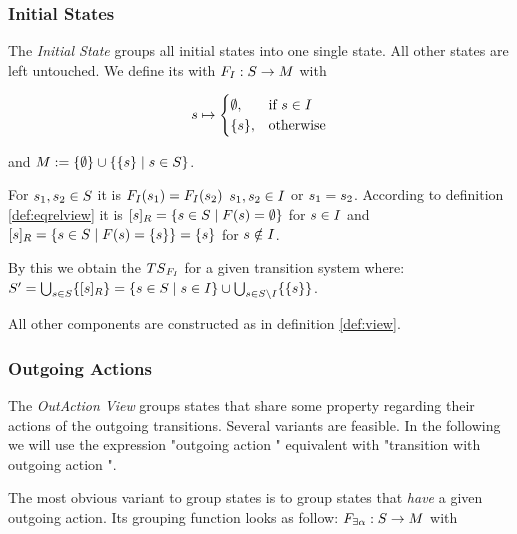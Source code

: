 \documentclass[preview]{standalone}
\begin{document}


\subsubsection{Initial States}
The \emph{Initial State \viewNC}  groups all initial states into one single state. All other states are left untouched.
We define its \grpfctN with ${F}_{I} : {S} \to {\ensuremath{{M}}}$ with 

\[
{s} \mapsto
\begin{cases}
	\emptyset,				& \text{if } {s} \in {I} \\
	\{{s}\},          	& \text{otherwise}
\end{cases}
\]

and ${{M}} := \{\emptyset\} \cup \{\{{s}\} \mid {s} \in {S}\}$.

For ${s}_1,{s}_2 \in {S}$ it is ${{{{F}}_{I}}}({s}_1) = {{{{F}}_{I}}}({s}_2)$ \iffN ${s}_1, {s}_2 \in {I}$ or ${s}_1 = {s}_2$. According to definition \ref{def:eqrelview} it is ${{[{s}]_{{R}}}} = \{{s} \in {S} \mid {F}({s}) = \emptyset\}$ for ${s} \in {I}$ and ${{[{s}]_{{R}}}} = \{{s} \in {S} \mid {F}({s}) = \{{s}\} \} = \{{s}\}$ for ${s} \notin {I}$.

By this we obtain the \viewN ${{{{TS}}_{{{{F}}_{I}}}}}$ for a given transition system \ts where: ${S}' = \bigcup_{{s} \in {S}} \{{{[{s}]_{{R}}}}\} = \{{s} \in {S} \mid {s} \in {I}\}\cup \bigcup_{{s} \in {S} \setminus {I}}\{\{{s}\}\}$.

All other components are constructed as in definition \ref{def:view}.

\subsubsection{Outgoing Actions}
The \emph{OutAction View} groups states that share some property regarding their actions  of the outgoing transitions. Several variants are feasible. In the following we will use the expression "outgoing action \action" equivalent with "transition with outgoing action \action".

The most obvious variant to group states is to group states that \emph{have} a given outgoing action. Its grouping function looks as follow: ${F}_{\exists{\alpha}} : {S} \to {\ensuremath{{M}}}$ with 
\end{document}
